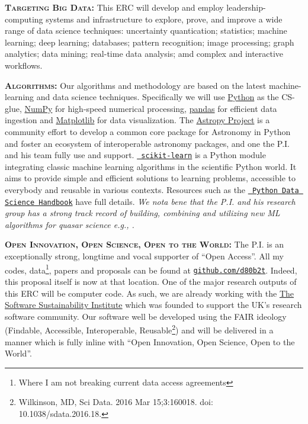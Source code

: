 \smallskip
\smallskip
\noindent
\textbf{\textsc{Targeting Big Data: }}
This ERC will develop and employ leadership-computing systems and
infrastructure to explore, prove, and improve a wide range of data
science techniques: uncertainty quantication; statistics; machine
learning; deep learning; databases; pattern recognition; image
processing; graph analytics; data mining; real-time data analysis; amd
complex and interactive workflows.

\smallskip
\smallskip
\noindent
\textbf{\textsc{Algorithms: }}
Our algorithms and methodology are based on the latest
machine-learning and data science techniques. Specifically we will use
\href{https://www.python.org/}{Python} as the CS-glue,
\href{http://www.numpy.org/}{NumPy} for high-speed numerical
processing, \href{https://pandas.pydata.org/}{pandas} for efficient
data ingestion and \href{https://matplotlib.org/}{Matplotlib} for data
visualization.  The \href{http://www.astropy.org/}{Astropy Project} is a
community effort to develop a common core package for Astronomy in
Python and foster an ecosystem of interoperable astronomy packages,
and one the P.I. and his team fully use and support.
\href{http://ogrisel.github.io/scikit-learn.org/sklearn-tutorial/index.html}{\tt
scikit-learn} is a Python module integrating classic machine learning
algorithms in the scientific Python world. It aims to provide simple and efficient solutions to
learning problems, accessible to everybody and reusable in various
contexts. Resources such as the
\href{https://github.com/jakevdp/PythonDataScienceHandbook}{{\tt
Python Data Science Handbook}} have full details. 
{\it We nota bene that the P.I. and his research group has a strong track 
record of building, combining and utilizing new ML algorithms for 
quasar science e.g., \citet{Ross2012}.}




\smallskip
\smallskip
\noindent
\textbf{\textsc{Open Innovation, Open Science, Open to the World:}}
The P.I. is an exceptionally strong, longtime and vocal supporter of
``Open Access''.  All my codes, data\footnote{Where I am not breaking
current data access agreements}, papers and proposals can be found at
\href{github.com/d80b2t}{{\tt github.com/d80b2t}}.  Indeed, this
proposal itself is now at that location.  One of the major research
outputs of this ERC will be computer code.  As such, we are already
working with the \href{\tt https://www.software.ac.uk/}{The Software
Sustainability Institute} which was founded to support the UK's
research software community.  Our software well be developed using the
FAIR ideology (Findable, Accessible, Interoperable,
Reusable\footnote{Wilkinson, MD, Sci Data. 2016 Mar 15;3:160018. doi:
10.1038/sdata.2016.18.})  and will be delivered in a manner which is
fully inline with ``Open Innovation, Open Science, Open to the
World''.



